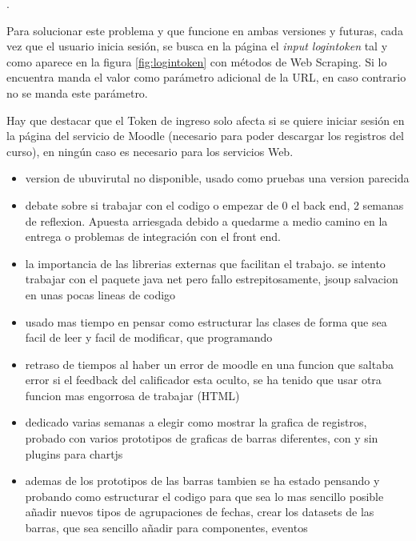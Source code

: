 .

Para solucionar este problema y que funcione en ambas versiones y futuras, cada vez que el usuario inicia sesión, se busca en la página el \textit{input logintoken} tal y como aparece en la figura \ref{fig:logintoken} con métodos de Web Scraping\cite{marti_que_2016}. Si lo encuentra manda el valor como parámetro adicional de la URL, en caso contrario no se manda este parámetro.

Hay que destacar que el Token de ingreso solo afecta si se quiere iniciar sesión en la página del servicio de Moodle (necesario para poder descargar los registros del curso), en ningún caso es necesario para los servicios Web.



\begin{itemize}
	\item version de ubuvirutal no disponible, usado como pruebas una version parecida
	\item debate sobre si trabajar con el codigo o empezar de 0 el back end, 2 semanas de reflexion. Apuesta arriesgada debido a quedarme a medio camino en la entrega o problemas de integración con el front end.
	\item la importancia de las librerias externas que facilitan el trabajo. se intento trabajar con el paquete java net pero fallo estrepitosamente, jsoup salvacion en unas pocas lineas de codigo
	\item usado mas tiempo en pensar como estructurar las clases de forma que sea facil de leer y facil de modificar, que programando
	\item retraso de tiempos al haber un error de moodle en una funcion que saltaba error si el feedback del calificador esta oculto, se ha tenido que usar otra funcion mas engorrosa de trabajar (HTML)
	\item dedicado varias semanas a elegir como mostrar la grafica de registros, probado con varios prototipos de graficas de barras diferentes, con y sin plugins para chartjs
	\item ademas de los prototipos de las barras tambien se ha estado pensando y probando como estructurar el codigo para que sea lo mas sencillo posible añadir nuevos tipos de agrupaciones de fechas, crear los datasets de las barras, que sea sencillo añadir para componentes, eventos
\end{itemize}

